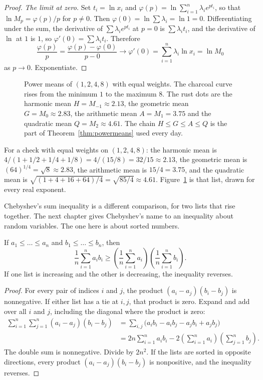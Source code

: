 \begin{proof}
\emph{The limit at zero.} Set $t_i=\ln x_i$ and $\varphi(p)=\ln\sum_{i=1}^n\lambda_ie^{pt_i}$, so that $\ln M_p=\varphi(p)/p$ for $p\ne0$. Then $\varphi(0)=\ln\sum\lambda_i=\ln1=0$. Differentiating under the sum, the derivative of $\sum\lambda_ie^{pt_i}$ at $p=0$ is $\sum\lambda_it_i$, and the derivative of $\ln$ at $1$ is $1$, so $\varphi'(0)=\sum\lambda_it_i$. Therefore
\[
\frac{\varphi(p)}{p}=\frac{\varphi(p)-\varphi(0)}{p-0}\to\varphi'(0)=\sum_{i=1}^n\lambda_i\ln x_i=\ln M_0
\]
as $p\to0$. Exponentiate.
\end{proof}

\begin{figure}[ht]
\centering
{}
\caption{Power means of $(1,2,4,8)$ with equal weights. The charcoal curve rises from the minimum $1$ to the maximum $8$. The rust dots are the harmonic mean $H=M_{-1}\approx2.13$, the geometric mean $G=M_0\approx2.83$, the arithmetic mean $A=M_1=3.75$ and the quadratic mean $Q=M_2\approx4.61$. The chain $H\le G\le A\le Q$ is the part of Theorem~\ref{thm:powermeans} used every day.}
\label{fig:powermeans}
\end{figure}

For a check with equal weights on $(1,2,4,8)$: the harmonic mean is $4/(1+1/2+1/4+1/8)=4/(15/8)=32/15\approx2.13$, the geometric mean is $(64)^{1/4}=\sqrt8\approx2.83$, the arithmetic mean is $15/4=3.75$, and the quadratic mean is $\sqrt{(1+4+16+64)/4}=\sqrt{85/4}\approx4.61$. Figure~\ref{fig:powermeans} is that list, drawn for every real exponent.

Chebyshev's sum inequality is a different comparison, for two lists that rise together. The next chapter gives Chebyshev's name to an inequality about random variables. The one here is about sorted numbers.

\begin{proposition}\label{prop:chebsum}
If $a_1\le\dots\le a_n$ and $b_1\le\dots\le b_n$, then
\[
\frac1n\sum_{i=1}^na_ib_i\ge\left(\frac1n\sum_{i=1}^na_i\right)\left(\frac1n\sum_{i=1}^nb_i\right).
\]
If one list is increasing and the other is decreasing, the inequality reverses.
\end{proposition}
\begin{proof}
For every pair of indices $i$ and $j$, the product $(a_i-a_j)(b_i-b_j)$ is nonnegative. If either list has a tie at $i,j$, that product is zero. Expand and add over all $i$ and $j$, including the diagonal where the product is zero:
\begin{align*}
\sum_{i=1}^n\sum_{j=1}^n(a_i-a_j)(b_i-b_j)
&=\sum_{i,j}\bigl(a_ib_i-a_ib_j-a_jb_i+a_jb_j\bigr)\\
&=2n\sum_{i=1}^na_ib_i-2\left(\sum_{i=1}^na_i\right)\left(\sum_{j=1}^nb_j\right).
\end{align*}
The double sum is nonnegative. Divide by $2n^2$. If the lists are sorted in opposite directions, every product $(a_i-a_j)(b_i-b_j)$ is nonpositive, and the inequality reverses.
\end{proof}

